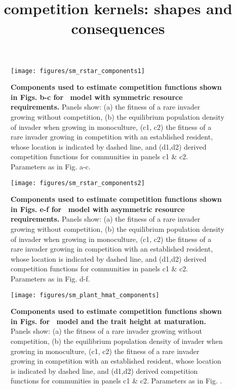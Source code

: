 \documentclass[10pt,twoside]{article}
\title{competition kernels: shapes and consequences}
\date{}
\begin{document}
\maketitle

\setcounter{secnumdepth}{1}

\begin{figure}[h]
 \centering
 \texttt{[image: figures/sm\_rstar\_components1]}
 \caption{\textbf{Components used to estimate competition functions shown in Figs.
 {\figRstar}b-c for \Rstar\ model with symmetric resource requirements.}
  Panels show: (a) the fitness of a rare invader growing without competition,
  (b) the equilibrium population density of invader when growing in monoculture,
  (c1, c2) the fitness of a rare invader growing in competition with an established
  resident, whose location is indicated by dashed line, and (d1,d2) derived competition
  functions for communities in panels  c1 \& c2. Parameters as in Fig.
  {\figRstar}a-c.
  \label{fig:sm_rstar_components1}}
\end{figure}

\begin{figure}[h]
 \centering
 \texttt{[image: figures/sm\_rstar\_components2]}
 \caption{\textbf{Components used to estimate competition functions shown in Figs.
 {\figRstar}e-f for \Rstar\ model with asymmetric resource requirements.}
  Panels show: (a) the fitness of a rare invader growing without competition,
  (b) the equilibrium population density of invader when growing in monoculture,
  (c1, c2) the fitness of a rare invader growing in competition with an established
  resident, whose location is indicated by dashed line, and (d1,d2) derived competition
  functions for communities in panels c1 \& c2. Parameters as in Fig.
  {\figRstar}d-f.
  \label{fig:sm_rstar_components2}}
\end{figure}

\begin{figure}[h]
 \centering
 \texttt{[image: figures/sm\_plant\_hmat\_components]}
 \caption{\textbf{Components used to estimate competition functions shown in Figs.
 {\figPlantHmat} for \plant\ model and the trait height at maturation.}
  Panels show: (a) the fitness of a rare invader growing without competition,
  (b) the equilibrium population density of invader when growing in monoculture,
  (c1, c2) the fitness of a rare invader growing in competition with an established
  resident, whose location is indicated by dashed line, and (d1,d2) derived competition
  functions for communities in panels c1 \& c2. Parameters as in Fig.
  {\figPlantHmat}.
  \label{fig:sm_plant_hmat_components}}
\end{figure}
\end{document}
